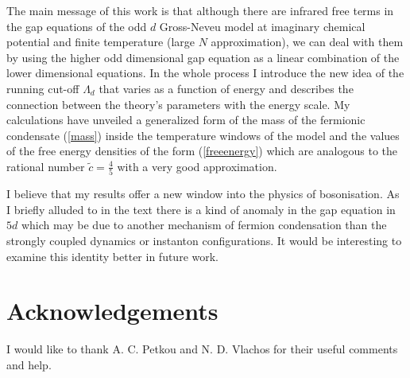 \documentclass[twoside]{article}
\begin{document}
The main message of this work is that although there are infrared free terms in the gap equations of the odd $d$ Gross-Neveu model at imaginary chemical potential and finite temperature (large $N$ approximation), we can deal with them by using the higher odd dimensional gap equation as a linear combination of the lower dimensional equations. In the whole process I introduce the new idea of the running cut-off $\Lambda_d$ that varies as a function of energy and describes the connection between the theory's parameters with the energy scale. My calculations have unveiled a generalized form of the mass of the fermionic condensate (\ref{mass}) inside the temperature windows of the model and the values of the free energy densities of the form (\ref{freeenergy}) which are analogous to the rational number $\tilde{c}=\frac{4}{5}$ with a very good approximation.

I believe that my results offer a new window into the physics of bosonisation. As I briefly alluded to in the text there is a kind of anomaly in the gap equation in $5d$ which may be due to another mechanism of fermion condensation than the strongly coupled dynamics or instanton configurations. It would be interesting to examine this identity better in future work.

\section*{Acknowledgements}
I would like to thank A. C. Petkou and N. D. Vlachos for their useful comments and help. 
\end{document}
